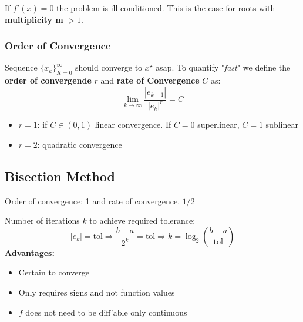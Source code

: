         If $f'(x)=0$ the problem is ill-conditioned. This is the case for roots with \textbf{multiplicity m} $> 1$.
        
        \subsubsection{Order of Convergence}
            Sequence $\{x_k\}_{K=0}^{\infty}$ should converge to $x^\star$ asap. To quantify "\textit{fast}" we define the \textbf{order of convergende} $r$ and \textbf{rate of Convergence} $C$ as:
            \begin{equation*}
                \lim_{k\to\infty}\frac{|e_{k+1}|}{|e_k|^r}= C
            \end{equation*}
            \begin{itemize}
                \item $r=1$: if $C\in(0,1)$ linear convergence. If $C = 0$ superlinear, $C = 1$ sublinear
                \item $r=2$: quadratic convergence
            \end{itemize}{}

\subsection{Bisection Method}
    Order of convergence: 1 and rate of convergence. $1/2$
    
    Number of iterations $k$ to achieve required tolerance:
    \begin{equation*}
        |e_k| = \textrm{tol} \Rightarrow \frac{b-a}{2^k}=\textrm{tol} \Rightarrow k = \log_2\left(\frac{b-a}{\textrm{tol}}\right)
    \end{equation*}
    \textbf{Advantages:}
    \begin{itemize}
        \item Certain to converge
        \item Only requires signs and not function values
        \item $f$ does not need to be diff'able only continuous
    \end{itemize}
    
